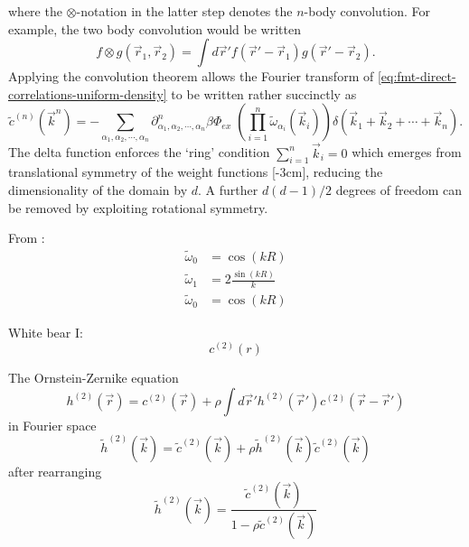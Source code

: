 \documentclass[12pt]{report}
\begin{document}
where the $\otimes$-notation in the latter step denotes the $n$-body convolution.
For example, the two body convolution would be written%
\begin{equation*}
  f \otimes g(\vec{r}_1, \vec{r}_2) =
  \int d\vec{r}' f(\vec{r}' - \vec{r}_1) g(\vec{r}' - \vec{r}_2).
\end{equation*}
Applying the convolution theorem allows the Fourier transform of \eqref{eq:fmt-direct-correlations-uniform-density} to be written rather succinctly as
\begin{equation}
  \tilde{c}^{(n)}(\vec{k}^n) =
  - \sum_{\alpha_1, \alpha_2, \cdots, \alpha_n}
  \partial^n_{\alpha_1, \alpha_2, \cdots, \alpha_n} \beta\Phi_{ex} \;
  \left( \prod_{i=1}^n \widetilde{\omega}_{\alpha_i}(\vec{k}_i) \right)
  \delta(\vec{k}_1 + \vec{k}_2 + \cdots + \vec{k}_n).
\end{equation}
The delta function enforces the `ring' condition $\sum_{i=1}^n \vec{k}_i = 0$ which emerges from translational symmetry of the weight functions%
[-3cm],
reducing the dimensionality of the domain by $d$.
A further $d(d-1)/2$ degrees of freedom%
can be removed by exploiting rotational symmetry.

From \cite{Rosenfeld1990}:
\begin{align}
  \widetilde{\omega}_0 &= \cos{(kR)} \\
  \widetilde{\omega}_1 &= 2\frac{\sin{(kR)}}{k} \\
  \widetilde{\omega}_0 &= \cos{(kR)}
\end{align}

White bear I:
\begin{equation}
  c^{(2)}(r)
\end{equation}

The Ornstein-Zernike equation
\begin{equation}
  h^{(2)}(\vec{r}) =
  c^{(2)}(\vec{r}) +
  \rho \int d\vec{r}' h^{(2)}(\vec{r}') c^{(2)}(\vec{r} - \vec{r}')
\end{equation}
in Fourier space
\begin{equation*}
  \tilde{h}^{(2)}(\vec{k}) =
  \tilde{c}^{(2)}(\vec{k}) +
  \rho \tilde{h}^{(2)}(\vec{k}) \tilde{c}^{(2)}(\vec{k})
\end{equation*}
after rearranging
\begin{equation}
  \tilde{h}^{(2)}(\vec{k}) =
  \frac{\tilde{c}^{(2)}(\vec{k})}{1 - \rho \tilde{c}^{(2)}(\vec{k})}
\end{equation}
\end{document}
